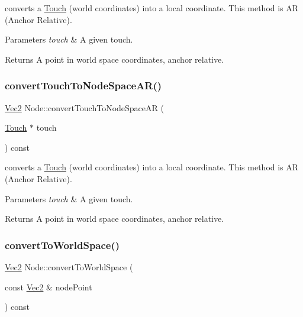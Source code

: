 converts a \hyperlink{classTouch}{Touch} (world coordinates) into a local coordinate. This method is AR (Anchor Relative).


\begin{DoxyParams}{Parameters}
{\em touch} & A given touch. \\
\hline
\end{DoxyParams}
\begin{DoxyReturn}{Returns}
A point in world space coordinates, anchor relative. 
\end{DoxyReturn}
\mbox{\label{classNode_af9a987bf0d6590367c254e78426773af}} 
\subsubsection{\texorpdfstring{convert\+Touch\+To\+Node\+Space\+A\+R()}{convertTouchToNodeSpaceAR()}\hspace{0.1cm}{\footnotesize\ttfamily [2/2]}}
{\footnotesize\ttfamily \hyperlink{classVec2}{Vec2} Node\+::convert\+Touch\+To\+Node\+Space\+AR (\begin{DoxyParamCaption}\item[{\hyperlink{classTouch}{Touch} $\ast$}]{touch }\end{DoxyParamCaption}) const}

converts a \hyperlink{classTouch}{Touch} (world coordinates) into a local coordinate. This method is AR (Anchor Relative).


\begin{DoxyParams}{Parameters}
{\em touch} & A given touch. \\
\hline
\end{DoxyParams}
\begin{DoxyReturn}{Returns}
A point in world space coordinates, anchor relative. 
\end{DoxyReturn}
\mbox{\label{classNode_a9da42e3d980d42aa9508a9de1b51040b}} 
\subsubsection{\texorpdfstring{convert\+To\+World\+Space()}{convertToWorldSpace()}\hspace{0.1cm}{\footnotesize\ttfamily [1/2]}}
{\footnotesize\ttfamily \hyperlink{classVec2}{Vec2} Node\+::convert\+To\+World\+Space (\begin{DoxyParamCaption}\item[{const \hyperlink{classVec2}{Vec2} \&}]{node\+Point }\end{DoxyParamCaption}) const}

